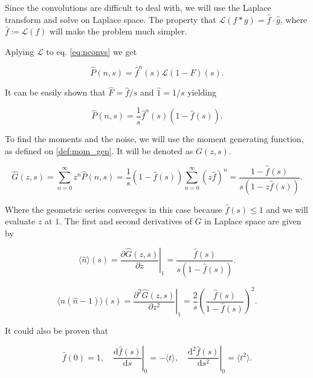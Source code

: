 Since the convolutions are difficult to deal with, we will use the Laplace transform and solve on Laplace space. The property that $\mathcal{L}(f\ast g) = \hat{f}\cdot\hat{g}$, where $\hat{f}\coloneqq\mathcal{L}(f)$ will make the problem much simpler.

Aplying $\mathcal{L}$ to eq. \eqref{eq:nconvs} we get

\begin{equation*}
  \hat{P}(n,s) = \hat{f}^n(s)\mathcal{L}(1-F)(s).
\end{equation*}

It can be easily shown that $\hat{F} = \hat{f}/s$ and $\hat{1} = 1/s$ yielding

\begin{equation}
  \label{eq:lapP}
  \hat{P}(n,s) = \frac{1}{s}\hat{f}^n(s)(1-\hat{f}(s)).
\end{equation}

To find the moments and the noise, we will use the moment generating function, as defined on \eqref{def:mom_gen}. It will be denoted as $G(z,s)$.

\begin{equation}
  \label{eq:lapG}
  \hat{G}(z,s) = \sum_{n=0}^{\infty}z^n\hat{P}(n,s) = \frac{1}{s}(1-\hat{f}(s))\sum_{n=0}^{\infty}(z\hat{f})^n=\frac{1-\hat{f}(s)}{s(1-z\hat{f}(s))}.
\end{equation}

Where the geometric series convereges in this case because $\hat{f}(s)\leq1$ and we will evaluate $z$ at $1$. The first and second derivatives of $G$ in Laplace space are given by

\begin{equation}
  \label{eq:lapavn}
  \langle\hat{n}\rangle(s) = \left.\frac{\partial\hat{G}(z,s)}{\partial z}\right|_1 = \frac{\hat{f}(s)}{s(1-\hat{f}(s))}.
\end{equation}

\begin{equation}
  \label{eq:lapvarn}
  \langle\hat{n}(\hat{n}-1)\rangle(s) = \left.\frac{\partial^2\hat{G}(z,s)}{\partial z^2}\right|_1 = \frac{2}{s}\left(\frac{\hat{f}(s)}{1-\hat{f}(s)}\right)^2.
\end{equation}

It could also be proven that

\begin{equation}
  \label{eq:lapfprop}
  \hat{f}(0) = 1, \quad \left.\frac{\mathrm{d}\hat{f}(s)}{\mathrm{d}s}\right|_0=-\langle t\rangle,\quad \left.\frac{\mathrm{d}^2\hat{f}(s)}{\mathrm{d}s^2}\right|_0=\langle t^2\rangle.
\end{equation}

